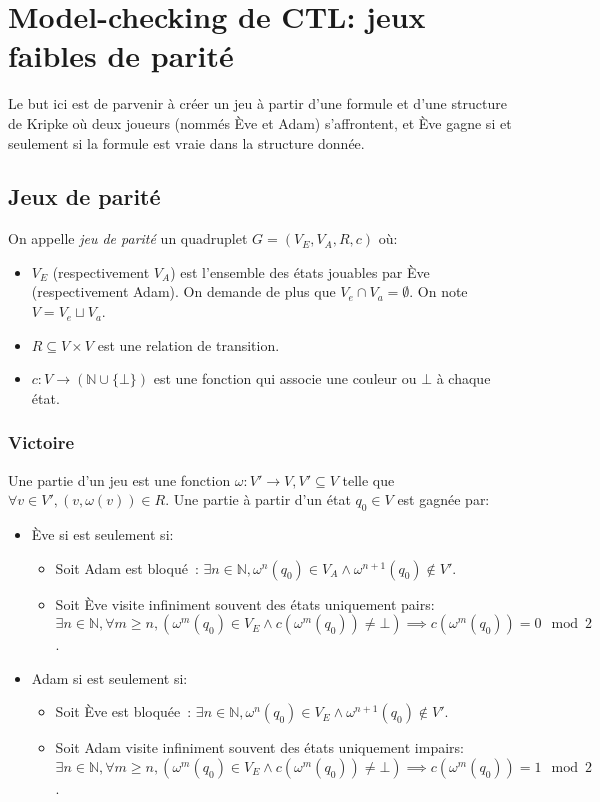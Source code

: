 \documentclass[10pt,a4paper]{article}
\begin{document}
\section{Model-checking de CTL: jeux faibles de parité}
Le but ici est de parvenir à créer un jeu à partir d'une formule et d'une structure de Kripke où deux joueurs (nommés Ève et Adam) s'affrontent, et Ève gagne si et seulement si la formule est vraie dans la structure donnée.

\subsection{Jeux de parité}
On appelle \emph{jeu de parité} un quadruplet $G = (V_E, V_A, R, c)$ où:
\begin{itemize}
\item $V_E$ (respectivement $V_A$) est l'ensemble des états jouables par Ève (respectivement Adam). On demande de plus que $V_e \cap V_a = \emptyset$. On note $V = V_e \sqcup V_a$.
\item $R \subseteq V \times V$ est une relation de transition.
\item $c : V \to (\mathbb{N} \cup \{\bot\})$ est une fonction qui associe une couleur ou $\bot$ à chaque état.
\end{itemize}

\subsubsection{Victoire}
Une partie d'un jeu est une fonction $\omega : V' \to V, V' \subseteq V$ telle que $\forall v \in V', (v,\omega(v)) \in R$.
Une partie à partir d'un état $q_0 \in V$ est gagnée par:
\begin{itemize}
\item Ève si est seulement si:
	\begin{itemize}
	\item Soit Adam est bloqué : $\exists n \in \mathbb{N}, \omega^n (q_0) \in V_A \land \omega^{n+1} (q_0) \notin V'$.
	\item Soit Ève visite infiniment souvent des états uniquement pairs: $\exists n \in \mathbb{N}, \forall m \geq n, (\omega^m(q_0) \in V_E \land c(\omega^m(q_0)) \neq \bot )\implies c(\omega^m(q_0)) = 0 \mod 2$.
	\end{itemize}
\item Adam si est seulement si:
\begin{itemize}
	\item Soit Ève est bloquée : $\exists n \in \mathbb{N}, \omega^n (q_0) \in V_E \land \omega^{n+1} (q_0) \notin V'$.
	\item Soit Adam visite infiniment souvent des états uniquement impairs: $\exists n \in \mathbb{N}, \forall m \geq n, (\omega^m(q_0) \in V_E \land c(\omega^m(q_0)) \neq \bot )\implies c(\omega^m(q_0)) = 1 \mod 2$.
\end{itemize}
\end{itemize}
\end{document}
